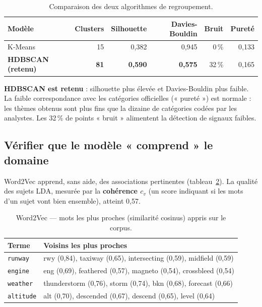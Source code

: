 \documentclass[11pt,a4paper]{article}
\begin{document}
\begin{table}[h]\centering\small
\caption{Comparaison des deux algorithmes de regroupement.}\label{tab:clust}
\begin{tabular}{lrrrrr}
\toprule
\textbf{Modèle} & \textbf{Clusters} & \textbf{Silhouette} & \textbf{Davies-Bouldin} & \textbf{Bruit} & \textbf{Pureté} \\
\midrule
K-Means & 15 & 0,382 & 0,945 & 0\,\% & 0,133 \\
\textbf{HDBSCAN (retenu)} & \textbf{81} & \textbf{0,590} & \textbf{0,575} & 32\,\% & 0,165 \\
\bottomrule
\end{tabular}
\end{table}
\textbf{HDBSCAN est retenu} : silhouette plus élevée et Davies-Bouldin plus faible. La faible
correspondance avec les catégories officielles (« pureté ») est normale : les thèmes obtenus
sont plus fins que la dizaine de catégories codées par les analystes. Les 32\,\% de points
« bruit » alimentent la détection de signaux faibles.

\subsection{Vérifier que le modèle « comprend » le domaine}
Word2Vec apprend, sans aide, des associations pertinentes (tableau~\ref{tab:w2v}). La qualité
des sujets LDA, mesurée par la \textbf{cohérence $c_v$} (un score indiquant si les mots d'un
sujet vont bien ensemble), atteint 0,57.

\begin{table}[h]\centering\small
\caption{Word2Vec — mots les plus proches (similarité cosinus) appris sur le corpus.}\label{tab:w2v}
\begin{tabular}{ll}
\toprule
\textbf{Terme} & \textbf{Voisins les plus proches} \\
\midrule
\texttt{runway}   & rwy (0,84), taxiway (0,65), intersecting (0,59), midfield (0,59) \\
\texttt{engine}   & eng (0,69), feathered (0,57), magneto (0,54), crossbleed (0,54) \\
\texttt{weather}  & thunderstorm (0,76), storm (0,74), bkn (0,68), forecast (0,66) \\
\texttt{altitude} & alt (0,70), descended (0,67), descend (0,65), level (0,64) \\
\bottomrule
\end{tabular}
\end{table}
\end{document}
